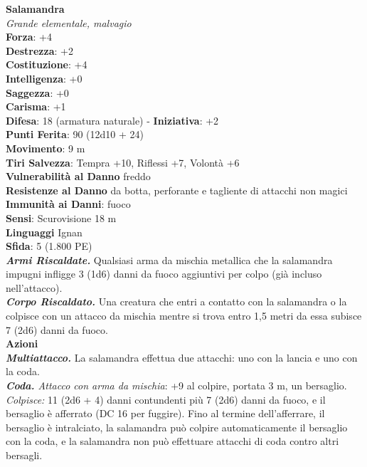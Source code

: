 \begin{multicols}{2}
\medskip\textbf{Salamandra}\\
\emph{Grande elementale, malvagio}\\
\textbf{Forza}: +4\\
\textbf{Destrezza}: +2\\
\textbf{Costituzione}: +4\\
\textbf{Intelligenza}: +0\\
\textbf{Saggezza}: +0\\
\textbf{Carisma}: +1\\
\textbf{Difesa}: 18 (armatura naturale) - \textbf{Iniziativa}: +2\\
\textbf{Punti Ferita}: 90 (12d10 + 24)\\
\textbf{Movimento}: 9 m\\
\textbf{Tiri Salvezza}: Tempra +10, Riflessi +7, Volontà +6\\
\textbf{Vulnerabilità al Danno} freddo\\
\textbf{Resistenze al Danno} da botta, perforante e tagliente di attacchi non magici\\
\textbf{Immunità ai Danni}: fuoco\\
\textbf{Sensi}: Scurovisione 18 m\\
\textbf{Linguaggi} Ignan\\
\textbf{Sfida}: 5 (1.800 PE)\smallskip\\
\emph{\textbf{Armi Riscaldate.}} Qualsiasi arma da mischia metallica che la salamandra impugni infligge 3 (1d6) danni da fuoco aggiuntivi per colpo (già incluso nell'attacco).\\
\emph{\textbf{Corpo Riscaldato.}} Una creatura che entri a contatto con la salamandra o la colpisce con un attacco da mischia mentre si trova entro 1,5 metri da essa subisce 7 (2d6) danni da fuoco.\\
\smallskip\textbf{Azioni}\\
\emph{\textbf{Multiattacco.}} La salamandra effettua due attacchi: uno con la lancia e uno con la coda.\\
\emph{\textbf{Coda.} Attacco con arma da mischia}: +9 al colpire, portata 3 m, un bersaglio.\\
\emph{Colpisce:} 11 (2d6 + 4) danni contundenti più 7 (2d6) danni da fuoco, e il bersaglio è afferrato (DC  16 per fuggire). Fino al termine dell'afferrare, il bersaglio è intralciato, la salamandra può colpire automaticamente il bersaglio con la coda, e la salamandra non può effettuare attacchi di coda contro altri bersagli.\\

\end{multicols}
